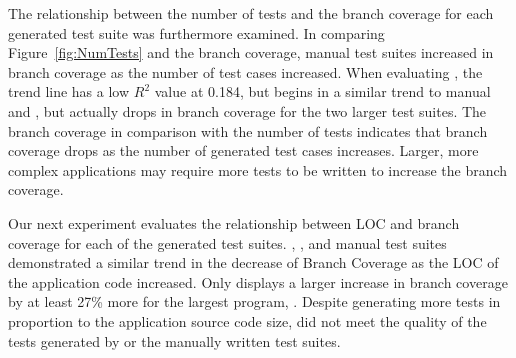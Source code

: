 The relationship between the number of tests and the branch coverage for each generated test suite was furthermore examined. In comparing Figure~\ref{fig:NumTests} and the branch coverage, manual test suites increased in branch coverage as the number of test cases increased. When evaluating \evo, the trend line has a low  $R^2$ value at 0.184, but begins in a similar trend to manual and \codepro, but actually drops in branch coverage for the two larger test suites. The branch coverage in comparison with the number of tests indicates that \codepro branch coverage drops as the number of generated test cases increases. Larger, more complex applications may require more tests to be written to increase the branch coverage. 


Our next experiment evaluates the relationship between LOC and branch coverage for each of the generated test suites.  \evo, \codepro, and manual test suites demonstrated a similar trend in the decrease of Branch Coverage as the LOC of the application code increased. Only \codepro displays a larger increase in branch coverage by at least 27\%  more for the largest program, \netweaver. Despite generating more tests in proportion to the application source code size,  \codepro did not meet the quality of the tests generated by \evo or the manually written test suites.


